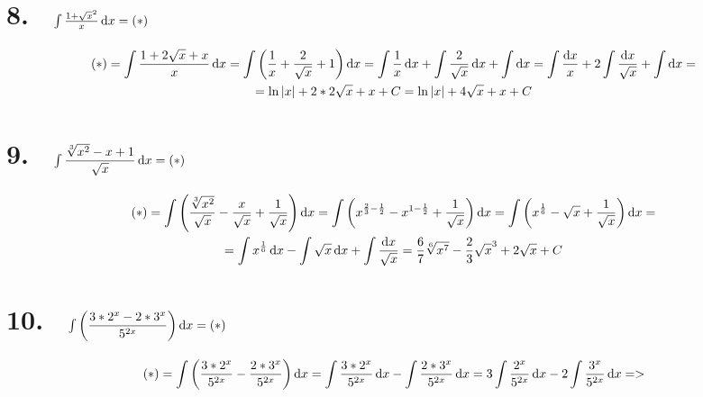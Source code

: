 \documentclass{article}
\begin{document}
	\section*{8. \ $\int \frac{{1 + \sqrt x}^2}x \dif x = (*)$}
		\begin{multline*}
			(*) = \int \dfrac{1 + 2\sqrt x + x}x \dif x = \int \left(\dfrac 1 x + \dfrac 2{\sqrt x} + 1\right) \dif x = \int \dfrac 1 x \dif x + \int \dfrac 2{\sqrt x} \dif x + \int \dif x = \int \dfrac{\dif x}x + 2\int \dfrac{\dif x}{\sqrt x} + \int \dif x =\\= \ln\left|x\right| + 2* 2\sqrt x + x + C = \ln\left|x\right| + 4\sqrt x + x + C
		\end{multline*}
		
	\section*{9. \ $\int \dfrac{\sqrt[3]{x^2} - x + 1}{\sqrt x} \dif x = (*)$}
		\begin{multline*}
			(*) = \int \left(\dfrac{\sqrt[3]{x^2}}{\sqrt x} -\dfrac x{\sqrt x} + \dfrac 1{\sqrt x}\right)\dif x = \int \left(x^{\frac 2 3 - \frac 1 2} - x^{1 - \frac 1 2} + \dfrac 1{\sqrt x}\right)\dif x = \int \left(x^{\frac 1 6} - \sqrt x + \dfrac 1{\sqrt x}\right)\dif x =\\= \int x ^{\frac 1 6} \dif x - \int \sqrt x \dif x + \int \dfrac{\dif x}{\sqrt x} = \dfrac 6 7 \sqrt[6]{x^7} - \dfrac 2 3 \sqrt x^3 + 2\sqrt x + C
		\end{multline*}
		
	\section*{10. \ $\int \left(\dfrac{3 * 2^x - 2 * 3^x}{5^{2x}}\right) \dif x = (*)$}
		\begin{multline*}
			(*) = \int \left(\dfrac{3 * 2^x}{5^{2x}} - \dfrac{2 * 3^x}{5^{2x}}\right) \dif x = \int \dfrac{3 * 2^x}{5^{2x}} \dif x - \int \dfrac{2 * 3^x}{5^{2x}} \dif x = 3\int \dfrac{2^x}{5^{2x}} \dif x - 2\int \dfrac{3^x}{5^{2x}} \dif x =>
		\end{multline*}
		
\end{document}
